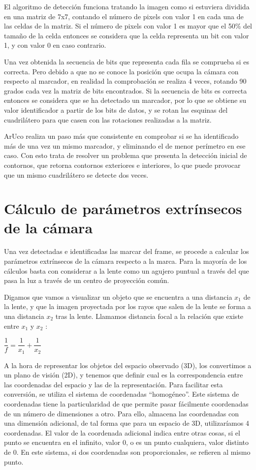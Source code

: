 \documentclass[10pt,a4paper]{article}
\begin{document}
El algoritmo de detección funciona tratando la imagen como si estuviera dividida en una matriz de 7x7, contando el número de pixels con valor 1 en cada una de las celdas de la matriz. Si el número de pixels con valor 1 es mayor que el 50\% del tamaño de la celda entonces se considera que la celda representa un bit con valor 1, y con valor 0 en caso contrario.

Una vez obtenida la secuencia de bits que representa cada fila se comprueba si es correcta. Pero debido a que no se conoce la posición que ocupa la cámara con respecto al marcador, en realidad la comprobación se realiza 4 veces, rotando 90 grados cada vez la matriz de bits encontrados. Si la secuencia de bits es correcta entonces se considera que se ha detectado un marcador, por lo que se obtiene su valor identificador a partir de los bits de datos, y se rotan las esquinas del cuadrilátero para que casen con las rotaciones realizadas a la matriz. 

ArUco realiza un paso más que consistente en comprobar si se ha identificado más de una vez un mismo marcador, y eliminando el de menor perímetro en ese caso. Con esto trata de resolver un problema que presenta la detección inicial de contornos, que retorna contornos exteriores e interiores, lo que puede provocar que un mismo cuadrilátero se detecte dos veces.


\section{Cálculo de parámetros extrínsecos de la cámara}
Una vez detectadas e identificadas las marcar del frame, se procede a calcular los parámetros extrínsecos de la cámara respecto a la marca. Para la mayoría de los cálculos basta con considerar a la lente como un agujero puntual a través del que pasa la luz a través de un centro de proyección común. 

Digamos que vamos a visualizar un objeto que se encuentra a una distancia $x_{1}$ de la lente, y que la imagen proyectada por los rayos que salen de la lente se forma a una distancia $x_{2}$ tras la lente. Llamamos distancia focal a la relación que existe entre $x_{1}$ y $x_{2}$ :
\begin{center}
$\dfrac{1}{f} = \dfrac{1}{x_{1}} + \dfrac{1}{x_{2}}$
\end{center}

A la hora de representar los objetos del espacio observado (3D), los convertimos a un plano de visión (2D), y tenemos que definir cual es la correspondencia entre las coordenadas del espacio y las de la representación. Para facilitar esta conversión, se utiliza el sistema de coordenadas “homogéneo”. Este sistema de coordenadas tiene la particularidad de que permite pasar fácilmente coordenadas de un número de dimensiones a otro. Para ello, almacena las coordenadas con una dimensión adicional, de tal forma que para un espacio de 3D, utilizaríamos 4 coordenadas. El valor de la coordenada adicional indica entre otras cosas, si el punto se encuentra en el infinito, valor 0, o es un punto cualquiera, valor distinto de 0. En este sistema, si dos coordenadas son proporcionales, se refieren al mismo punto.
\end{document}
